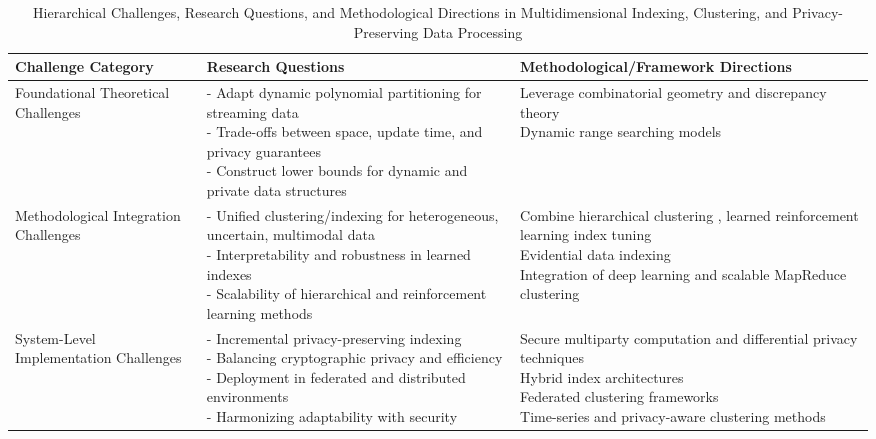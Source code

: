 \documentclass[sigconf]{acmart}
\begin{document}
\begin{table*}[htbp]
\centering
\caption{Hierarchical Challenges, Research Questions, and Methodological Directions in Multidimensional Indexing, Clustering, and Privacy-Preserving Data Processing}
\label{table:roadmap}
\begin{adjustbox}{max width=\textwidth}
\begin{tabular}{@{}lll@{}}
\toprule
\textbf{Challenge Category} & \textbf{Research Questions} & \textbf{Methodological/Framework Directions} \\
\midrule
Foundational Theoretical Challenges & 
\makecell[l]{- Adapt dynamic polynomial partitioning for streaming data \\ - Trade-offs between space, update time, and privacy guarantees \\ - Construct lower bounds for dynamic and private data structures} & 
\makecell[l]{Leverage combinatorial geometry and discrepancy theory\\ Dynamic range searching models \cite{ref1,ref2,ref8}} \\
\midrule
Methodological Integration Challenges & 
\makecell[l]{- Unified clustering/indexing for heterogeneous, uncertain, multimodal data \\ - Interpretability and robustness in learned indexes \\ - Scalability of hierarchical and reinforcement learning methods} & 
\makecell[l]{Combine hierarchical clustering \cite{ref17}, learned reinforcement learning index tuning \cite{ref33} \\ Evidential data indexing \cite{ref30} \\ Integration of deep learning and scalable MapReduce clustering \cite{ref16}} \\
\midrule
System-Level Implementation Challenges & 
\makecell[l]{- Incremental privacy-preserving indexing \\ - Balancing cryptographic privacy and efficiency \\ - Deployment in federated and distributed environments \\ - Harmonizing adaptability with security} & 
\makecell[l]{Secure multiparty computation and differential privacy techniques \cite{ref28} \\ Hybrid index architectures \cite{ref35} \\ Federated clustering frameworks \cite{ref22} \\ Time-series and privacy-aware clustering methods \cite{ref23}} \\
\bottomrule
\end{tabular}
\end{adjustbox}
\end{table*}
\end{document}
